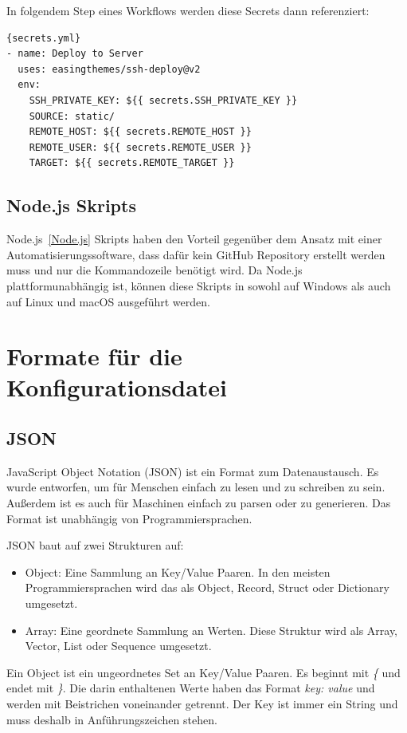 In folgendem Step eines Workflows werden diese Secrets dann referenziert:

\begin{lstlisting}[label={lst:secrets.yml}]{secrets.yml}
- name: Deploy to Server
  uses: easingthemes/ssh-deploy@v2
  env:
    SSH_PRIVATE_KEY: ${{ secrets.SSH_PRIVATE_KEY }}
    SOURCE: static/
    REMOTE_HOST: ${{ secrets.REMOTE_HOST }}
    REMOTE_USER: ${{ secrets.REMOTE_USER }}
    TARGET: ${{ secrets.REMOTE_TARGET }}
\end{lstlisting}

\subsection{Node.js Skripts}
Node.js~\ref{Node.js} Skripts haben den Vorteil gegenüber dem Ansatz mit einer Automatisierungssoftware,
dass dafür kein GitHub Repository erstellt werden muss und nur die Kommandozeile benötigt wird.
Da Node.js plattformunabhängig ist, können diese Skripts in sowohl auf Windows als auch auf
Linux und macOS ausgeführt werden.

\section{Formate für die Konfigurationsdatei}
 \subsection{JSON}
 JavaScript Object Notation (JSON) ist ein Format zum Datenaustausch.
 Es wurde entworfen, um für Menschen einfach zu lesen und zu schreiben zu sein.
 Außerdem ist es auch für Maschinen einfach zu parsen oder zu generieren.
 Das Format ist unabhängig von Programmiersprachen.

 JSON baut auf zwei Strukturen auf:

 \begin{itemize}
     \item Object: Eine Sammlung an Key/Value Paaren.
     In den meisten Programmiersprachen wird das als Object, Record, Struct
     oder Dictionary umgesetzt.
     \item Array: Eine geordnete Sammlung an Werten.
     Diese Struktur wird als Array, Vector, List oder Sequence umgesetzt.
 \end{itemize}

 Ein Object ist ein ungeordnetes Set an Key/Value Paaren.
 Es beginnt mit \textit{\{} und endet mit \textit{\}}.
 Die darin enthaltenen Werte haben das Format \textit{key: value} und werden mit Beistrichen voneinander getrennt.
 Der Key ist immer ein String und muss deshalb in Anführungszeichen stehen.

